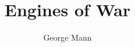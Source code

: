 \documentclass[10pt,twoside,openright,a5paper]{book}
\title{Engines of War}
\author{George Mann}
\date{}
\begin{document}
\pagestyle{plain}

\begin{titlepage}

\end{titlepage}

\maketitle

\tableofcontents

\newpage




\end{document}
